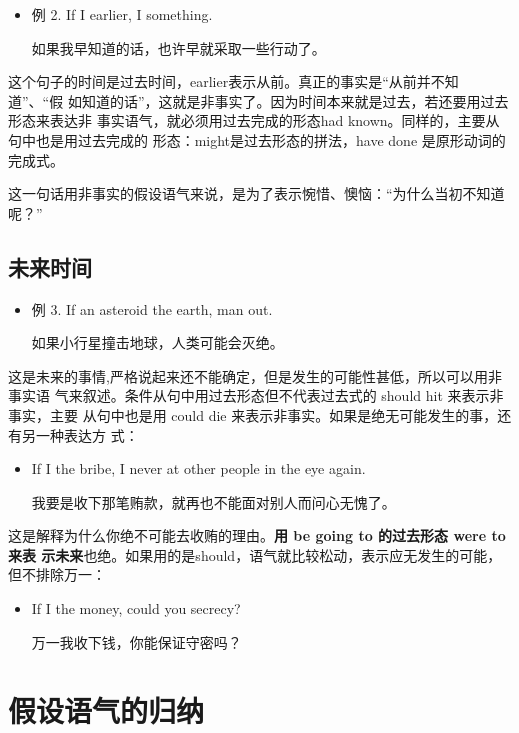 \begin{itemize}
\item 例 2. If I  earlier, I  something.

  如果我早知道的话，也许早就采取一些行动了。
\end{itemize}

这个句子的时间是过去时间，earlier表示从前。真正的事实是“从前并不知道”、“假
如知道的话”，这就是非事实了。因为时间本来就是过去，若还要用过去形态来表达非
事实语气，就必须用过去完成的形态had known。同样的，主要从句中也是用过去完成的
形态：might是过去形态的拼法，have done 是原形动词的完成式。

这一句话用非事实的假设语气来说，是为了表示惋惜、懊恼：“为什么当初不知道呢？”

\subsection{未来时间}

\begin{itemize}
\item  例 3. If an asteroid  the earth, man  out.

  如果小行星撞击地球，人类可能会灭绝。
\end{itemize}
这是未来的事情,严格说起来还不能确定，但是发生的可能性甚低，所以可以用非事实语
气来叙述。条件从句中用过去形态但不代表过去式的 should hit 来表示非事实，主要
从句中也是用 could die 来表示非事实。如果是绝无可能发生的事，还有另一种表达方
式：
\begin{itemize}
\item If I  the bribe, I  never  at other people in the
  eye again.

  我要是收下那笔贿款，就再也不能面对别人而问心无愧了。
\end{itemize}
这是解释为什么你绝不可能去收贿的理由。\textbf{用 be going to 的过去形态 were to来表
  示未来}也绝。如果用的是should，语气就比较松动，表示应无发生的可能，但不排除万一：
\begin{itemize}
\item  If I  the money, could you  secrecy?

  万一我收下钱，你能保证守密吗？
\end{itemize}

\section{假设语气的归纳}

